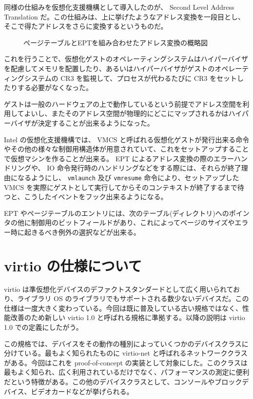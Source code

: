\documentclass[a4paper,11pt,report]{ltjsbook}
\begin{document}
同様の仕組みを仮想化支援機構として導入したのが、 Second Level Address Translation だ。この仕組みは、上に挙げたようなアドレス変換を一段目とし、そこで得たアドレスをさらに変換するというものだ。


\begin{figure}[htbp]
  \begin{center}
		\resizebox{\textwidth}{!}{
		
	}
  \end{center}
  \caption{ページテーブルとEPTを組み合わせたアドレス変換の概略図}
\end{figure}

これを行うことで、仮想化ゲストのオペレーティングシステムはハイパーバイザを配慮してメモリを配置したり、あるいはハイパーバイザがゲストのオペレーティングシステムの CR3 を監視して、プロセスが代わるたびに CR3 をセットしたりする必要がなくなった。

ゲストは一般のハードウェアの上で動作しているという前提でアドレス空間を利用してよいし、またそのアドレス空間が物理的にどこにマップされるかはハイパーバイザが決定することが出来るようになった。

Intel の仮想化支援機構では、 VMCS と呼ばれる仮想化ゲストが発行出来る命令やその他の様々な制御用構造体が用意されていて、これをセットアップすることで仮想マシンを作ることが出来る。 EPT によるアドレス変換の際のエラーハンドリングや、 IO 命令発行時のハンドリングなどをする際には、それらが終了理由になるようにし、 \texttt{vmlaunch} 及び \texttt{vmresume} 命令により、セットアップした VMCS を実際にゲストとして実行してからそのコンテキストが終了するまで待つと、こうしたイベントをフック出来るようになる。

EPT やページテーブルのエントリには、次のテーブル(ディレクトリ)へのポインタの他に制御用のビットフィールドがあり、これによってページのサイズやエラー時に起きるべき例外の選択などが出来る。

\section{virtio の仕様について}

virtio は準仮想化デバイスのデファクトスタンダードとして広く用いられており、ライブラリ OS のライブラリでもサポートされる数少ないデバイスだ。この仕様は一度大きく変わっている。今回は既に普及している古い規格ではなく、性能改善のため新しい virtio 1.0 と呼ばれる規格に準拠する。以降の説明は virtio 1.0\cite{virtio_spec} での定義にしたがう。

この規格では、デバイスをその動作の種別によっていくつかのデバイスクラスに分けている。最もよく知られたものに virtio-net と呼ばれるネットワーククラスがある。今回はこれを proof-of-concept の実装として対象にした。このクラスは最もよく知られ、広く利用されているだけでなく、パフォーマンスの測定に便利だという特徴がある。この他のデバイスクラスとして、コンソールやブロックデバイス、ビデオカードなどが挙げられる。
\end{document}
